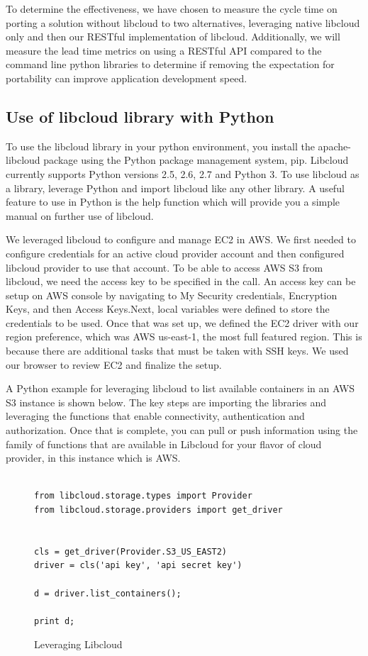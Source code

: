 To determine the effectiveness, we have chosen to measure the cycle time on porting a 
solution without libcloud to two alternatives, leveraging native libcloud only and then 
our RESTful implementation of libcloud. Additionally, we will measure the lead time 
metrics on using a RESTful API compared to the command line python libraries to determine
if removing the expectation for portability can improve application development speed.

\subsection{Use of libcloud library with Python}

To use the libcloud library in your python environment, you install the apache-libcloud 
package using the Python package management system, pip. Libcloud currently supports Python
versions 2.5, 2.6, 2.7 and Python 3. To use libcloud as a library,
leverage Python and import libcloud like any other library. A useful feature to use in 
Python is the help function which will provide you a simple 
manual on further use of libcloud.

We leveraged libcloud to configure and manage EC2 in AWS. We first needed to configure 
credentials for an active cloud provider account and then configured libcloud provider 
to use that account. To be able to access AWS S3 from libcloud, we need the access key 
to be specified in the call. An access key can be setup on AWS console by navigating to 
My Security credentials, Encryption Keys, and then Access Keys.Next, local variables 
were defined to store the credentials to be used. Once that was set up, we defined the EC2 
driver with our region preference, which was AWS us-east-1, the most full featured region. 
This is because there are additional tasks that must be taken with SSH keys. We used our 
browser to review EC2 and finalize the setup.

A Python example for leveraging libcloud to list available containers in an AWS S3 
instance is shown below. The key steps are importing the libraries and leveraging the
functions that enable connectivity, authentication and authorization. Once that is 
complete, you can pull or push information using the family of functions that are 
available in Libcloud for your flavor of cloud provider, in this instance which is AWS.

\begin{figure}[htb]

\begin{verbatim}

from libcloud.storage.types import Provider
from libcloud.storage.providers import get_driver


cls = get_driver(Provider.S3_US_EAST2)
driver = cls('api key', 'api secret key')

d = driver.list_containers();

print d;

\end{verbatim}

\caption{Leveraging Libcloud \cite{hid-sp18-518-LibCloud}}\label{c:libcloud-example}

\end{figure}
 

